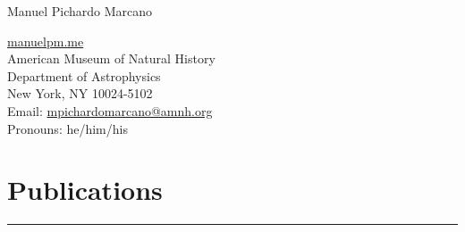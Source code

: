 \documentclass[letterpaper,10pt]{article}
\def\name{Manuel Pichardo Marcano}
\begin{document}
\begin{huge}
\name
\end{huge}





\vspace{.3 cm}

\begin{minipage}{0.6\linewidth}
  \href{www.manuelpm.me}{manuelpm.me} \\
American Museum of Natural History \\
  Department of Astrophysics \\
  New York, NY 10024-5102\\
Email:  \href{mailto:mpichardomarcano@amnh.org}{mpichardomarcano@amnh.org}\\
 Pronouns: he/him/his 
\end{minipage}

\section*{Publications }%
\hrule
\vspace{.3 cm}
\end{document}
